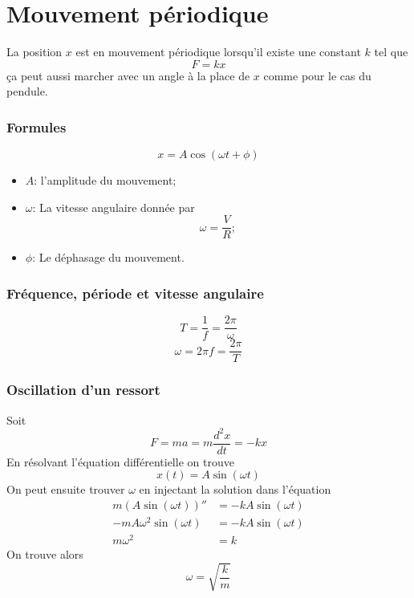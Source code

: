 \part{Mouvement périodique}
La position $x$ est en mouvement périodique
lorsqu'il existe une constant $k$ tel que
\[ F = kx \]
ça peut aussi marcher avec un angle
à la place de $x$ comme pour le cas du pendule.

\section{Formules}
\[ x = A\cos{(\omega{t} + \phi)} \]
\begin{itemize}
  \item \emph{$A$}: l'amplitude du mouvement;
  \item \emph{$\omega$}: La vitesse angulaire donnée par
    \[ \omega = \frac{V}{R}; \]
  \item \emph{$\phi$}: Le déphasage du mouvement.
\end{itemize}
\section{Fréquence, période et vitesse angulaire}
\[ T = \frac{1}{f} = \frac{2\pi}{\omega} \]
\[ \omega = 2\pi{f} = \frac{2\pi}{T} \]

\section{Oscillation d'un ressort}
Soit
\[ F = ma = m\frac{d^2x}{dt} = -kx \]
En résolvant l'équation différentielle on trouve
\[ x(t) = A\sin{(\omega{t})} \]
On peut ensuite trouver $\omega$ en injectant la solution dans l'équation
\begin{align*}
  m(A\sin{(\omega{t})})'' & = - kA\sin{(\omega{t})}\\
  -mA\omega^2\sin{(\omega{t})} & = - kA\sin{(\omega{t})}\\
  m\omega^2 & = k
\end{align*}
On trouve alors
\[ \omega = \sqrt{\frac{k}{m}} \]

